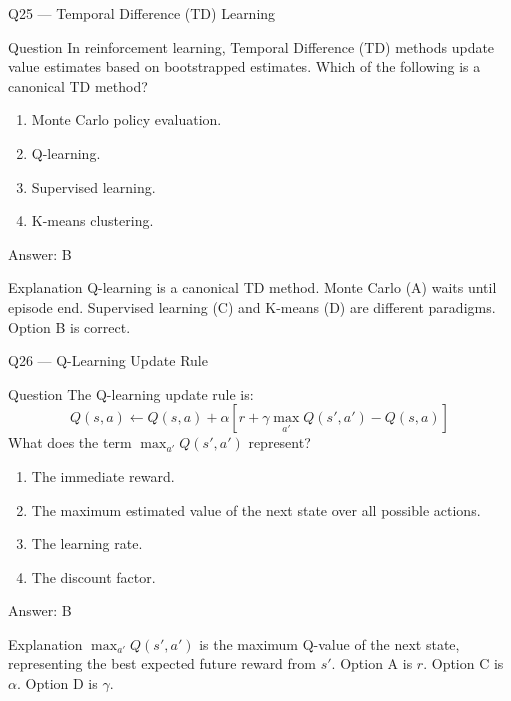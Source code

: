 \documentclass[aspectratio=169,8pt]{beamer}
\begin{document}
	\begin{frame}{Q25 --- Temporal Difference (TD) Learning}
		\begin{block}{Question}
			In reinforcement learning, Temporal Difference (TD) methods update value estimates based on bootstrapped estimates. Which of the following is a canonical TD method?
			\begin{enumerate}
				\item Monte Carlo policy evaluation.
				\item Q-learning.
				\item Supervised learning.
				\item K-means clustering.
			\end{enumerate}
		\end{block}
		\begin{exampleblock}{Answer: B}\end{exampleblock}
		\begin{block}{Explanation}
			Q-learning is a canonical TD method. Monte Carlo (A) waits until episode end. Supervised learning (C) and K-means (D) are different paradigms. Option B is correct.
		\end{block}
	\end{frame}
	
	\begin{frame}{Q26 --- Q-Learning Update Rule}
		\begin{block}{Question}
			The Q-learning update rule is:
			\[
			Q(s,a) \leftarrow Q(s,a) + \alpha \left[ r + \gamma \max_{a'} Q(s',a') - Q(s,a) \right]
			\]
			What does the term $\max_{a'} Q(s',a')$ represent?
			\begin{enumerate}
				\item The immediate reward.
				\item The maximum estimated value of the next state over all possible actions.
				\item The learning rate.
				\item The discount factor.
			\end{enumerate}
		\end{block}
		\begin{exampleblock}{Answer: B}\end{exampleblock}
		\begin{block}{Explanation}
			$\max_{a'} Q(s',a')$ is the maximum Q-value of the next state, representing the best expected future reward from $s'$. Option A is $r$. Option C is $\alpha$. Option D is $\gamma$.
		\end{block}
	\end{frame}
	
\end{document}
